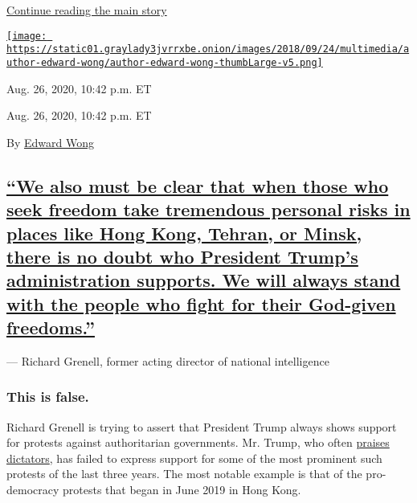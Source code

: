 \protect\hyperlink{after-dfp-ad-mid6}{Continue reading the main story}

\href{https://www.nytimes3xbfgragh.onion/by/edward-wong}{\texttt{[image: https://static01.graylady3jvrrxbe.onion/images/2018/09/24/multimedia/author-edward-wong/author-edward-wong-thumbLarge-v5.png]}}

Aug. 26, 2020, 10:42 p.m. ET

Aug. 26, 2020, 10:42 p.m. ET

By \href{https://www.nytimes3xbfgragh.onion/by/edward-wong}{Edward Wong}

\hypertarget{we-also-must-be-clear-that-when-those-who-seek-freedom-take-tremendous-personal-risks-in-places-like-hong-kong-tehran-or-minsk-there-is-no-doubt-who-president-trumps-administration-supports-we-will-always-stand-with-the-people-who-fight-for-their-god-given-freedoms}{%
\subsection{\texorpdfstring{\protect\hyperlink{we-also-must-be-clear-that-when-those-who-seek-freedom-take-tremendous-personal-risks-in-places-like-hong-kong-tehran-or-minsk-t}{``We
also must be clear that when those who seek freedom take tremendous
personal risks in places like Hong Kong, Tehran, or Minsk, there is no
doubt who President Trump's administration supports. We will always
stand with the people who fight for their God-given
freedoms.''}}{``We also must be clear that when those who seek freedom take tremendous personal risks in places like Hong Kong, Tehran, or Minsk, there is no doubt who President Trump's administration supports. We will always stand with the people who fight for their God-given freedoms.''}}\label{we-also-must-be-clear-that-when-those-who-seek-freedom-take-tremendous-personal-risks-in-places-like-hong-kong-tehran-or-minsk-there-is-no-doubt-who-president-trumps-administration-supports-we-will-always-stand-with-the-people-who-fight-for-their-god-given-freedoms}}

--- Richard Grenell, former acting director of national intelligence

\hypertarget{this-is-false-2}{%
\subsubsection{\texorpdfstring{\textbf{This is
false.}}{This is false.}}\label{this-is-false-2}}

Richard Grenell is trying to assert that President Trump always shows
support for protests against authoritarian governments. Mr. Trump, who
often
\href{https://www.defendingdemocracytogether.org/national-security/}{praises
dictators}, has failed to express support for some of the most prominent
such protests of the last three years. The most notable example is that
of the pro-democracy protests that began in June 2019 in Hong Kong.

